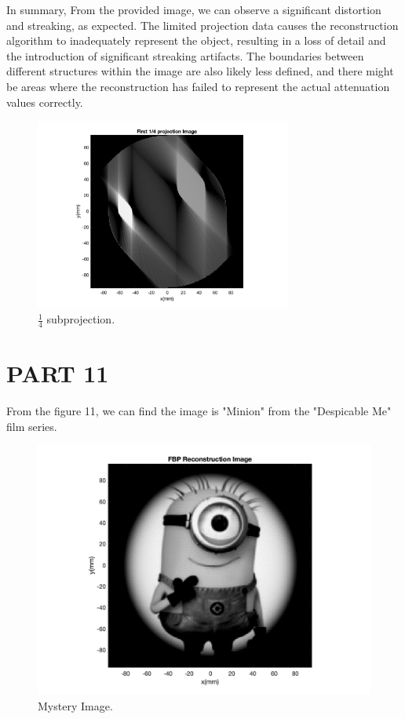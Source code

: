 \documentclass{report}
\begin{document}
In summary, From the provided image, we can observe a significant distortion and 
streaking, as expected. The limited projection data causes the reconstruction 
algorithm to inadequately represent the object, resulting in a loss of detail 
and the introduction of significant streaking artifacts. The boundaries between 
different structures within the image are also likely less defined, and there might 
be areas where the reconstruction has failed to represent the actual attenuation 
values correctly.
\begin{figure}[hb]
    \centering
    \includegraphics[width=0.75\textwidth]{10.png}
    \caption{$\frac{1}{4}$ subprojection.}
\end{figure}
\newpage 
\section[short]{PART 11}
From the figure 11, we can find the image is "Minion" from the "Despicable Me" film series.\\

\begin{figure}[hb]
    \centering
    \includegraphics[width=1\textwidth]{11.png}
    \caption{Mystery Image.}
\end{figure}
\newpage 
\end{document}
